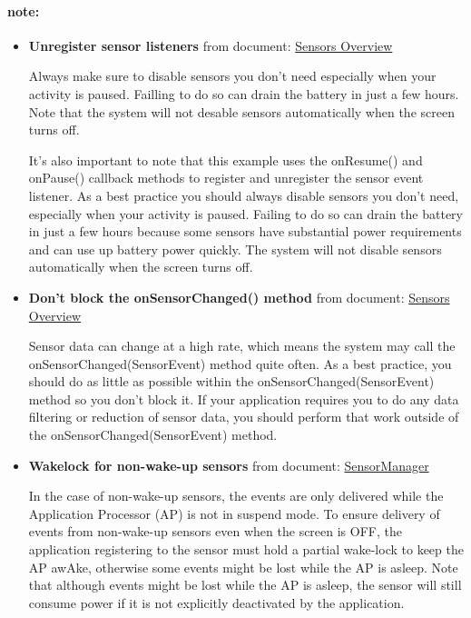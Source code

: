 \documentclass{article}
\begin{document}
{
  \small
  \paragraph{note:}
  \begin{itemize}

  \item \textbf{Unregister sensor listeners} from document:
    \href{https://developer.android.com/guide/topics/sensors/sensors_overview.html#sensors-monitor}
    {Sensors Overview}

  Always make sure to disable sensors you don't need especially when your
  activity is paused. Failling to do so can drain the battery in just a few hours.
  Note that the system will not desable sensors automatically when the screen
  turns off.

  It's also important to note that this example uses the onResume() and onPause()
  callback methods to register and unregister the sensor event listener. As a best
  practice you should always disable sensors you don't need, especially when your
  activity is paused. Failing to do so can drain the battery in just a few hours
  because some sensors have substantial power requirements and can use up battery
  power quickly. The system will not disable sensors automatically when the screen
  turns off.
  
\item 
\textbf{Don't block the onSensorChanged() method}
  from document: \href{https://developer.android.com/guide/topics/sensors/sensors_overview.html#sensors-practices}
  {Sensors Overview}

  Sensor data can change at a high rate, which means the system may call the
  onSensorChanged(SensorEvent) method quite often. As a best practice, you should
  do as little as possible within the onSensorChanged(SensorEvent) method so you
  don't block it. If your application requires you to do any data filtering or
  reduction of sensor data, you should perform that work outside of the
  onSensorChanged(SensorEvent) method.

\item 
  \textbf{Wakelock for non-wake-up sensors}
  from document: \href{https://developer.android.com/reference/android/hardware/SensorManager.html#registerListener(android.hardware.SensorEventListener,%20android.hardware.Sensor,%20int,%20int)}
    {SensorManager}


  In the case of non-wake-up sensors, the events are only delivered while the
  Application Processor (AP) is not in suspend mode.
  To ensure delivery of events from non-wake-up sensors even when the
  screen is OFF, the application registering to the sensor must hold a partial
  wake-lock to keep the AP awAke, otherwise some events might be lost while the AP
  is asleep. Note that although events might be lost while the AP is asleep, the
  sensor will still consume power if it is not explicitly deactivated by the
  application.

  \end{itemize}
}
\end{document}
